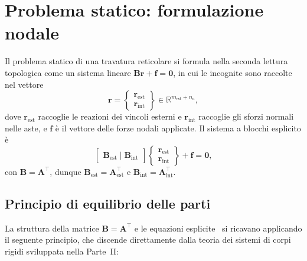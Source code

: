 \section{Problema statico: formulazione nodale}
\label{sec:equilibrio_parti}

Il problema statico di una travatura reticolare
si formula nella seconda lettura topologica
come un sistema lineare $\bm{B}\bm{r} + \bm{f} = \bm{0}$,
in cui le incognite sono raccolte nel vettore
\begin{equation}\label{eq:vettore_r_reticolare}
	\bm{r} = 
	\left\{
	\begin{array}{c} \bm{r}_\text{est} \\ \bm{r}_\text{int} 
	\end{array}
	\right\} \in \mathbb{R}^{m_\text{est}+n_a},
\end{equation}
dove $\bm{r}_\text{est}$ raccoglie le reazioni
dei vincoli esterni e $\bm{r}_\text{int} $
raccoglie gli sforzi normali nelle aste, e
$\bm{f}$ è il vettore delle forze nodali applicate.
Il sistema a blocchi esplicito è
\begin{equation}\label{eq:Br+f=0}
	\begin{bmatrix} \bm{B}_\text{est} \mid \bm{B}_\text{int}
	\end{bmatrix}
	\left\{
	\begin{array}{c} \bm{r}_\text{est} \\ \bm{r}_\text{int}
	\end{array}
	\right\} + \bm{f} = \bm{0},
\end{equation}
con $\bm{B} = \bm{A}^\top$, dunque
$\bm{B}_\text{est} = \bm{A}_\text{est}^\top$ e
$\bm{B}_\text{int} = \bm{A}_\text{int}^\top$.


\subsection{Principio di equilibrio delle parti}
\label{subsec:equilibrio_parti}

La struttura della matrice $\bm{B} = \bm{A}^\top$
e le equazioni esplicite~ si
ricavano applicando il seguente principio, che
discende direttamente dalla teoria dei sistemi
di corpi rigidi sviluppata nella Parte~II:


